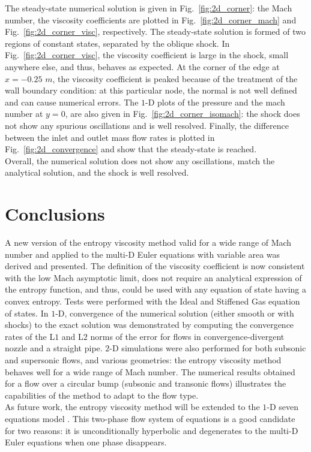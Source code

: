 \documentclass[preprint,10pt]{elsarticle}
\newcommand{\fig}[1]{Fig.~\ref{#1}}                      %
\begin{document}
The steady-state numerical solution is given in \fig{fig:2d_corner}: the Mach number, the viscosity coefficients are plotted in \fig{fig:2d_corner_mach} and \fig{fig:2d_corner_visc}, respectively. The steady-state solution is formed of two regions of constant states, separated by the oblique shock. In \fig{fig:2d_corner_visc}, the viscosity coefficient is large in the shock, small anywhere else, and thus, behaves as expected. At the corner of the edge at $x=-0.25$ $m$, the viscosity coefficient is peaked because of the treatment of the wall boundary condition: at this particular node, the normal is not well defined and can cause numerical errors. The $1$-D plots of the pressure and the mach number at $y=0$, are also given in \fig{fig:2d_corner_isomach}: the shock does not show any spurious oscillations and is well resolved. Finally, the difference between the inlet and outlet mass flow rates is plotted in \fig{fig:2d_convergence} and show that the steady-state is reached. \\
Overall, the numerical solution does not show any oscillations, match the analytical solution, and the shock is well resolved.
\section{Conclusions} \label{sec:ccl}
A new version of the entropy viscosity method valid for a wide range of Mach number and applied to the multi-D Euler equations with variable area was derived and presented. The definition of the viscosity coefficient is now consistent with the low Mach asymptotic limit, does not require an analytical expression of the entropy function, and thus, could be used with any equation of state having a convex entropy. Tests were performed with the Ideal and Stiffened Gas equation of states. In $1$-D, convergence of the numerical solution (either smooth or with shocks) to the exact solution was demonstrated by computing the convergence rates of the L$1$ and L$2$ norms of the error for flows in convergence-divergent nozzle and a straight pipe. $2$-D simulations were also performed for both subsonic and supersonic flows, and various geometries: the entropy viscosity method behaves well for a wide range of Mach number. The numerical results obtained for a flow over a circular bump (subsonic and transonic flows) illustrates the capabilities of the method to adapt to the flow type. \\
As future work, the entropy viscosity method will be extended to the $1$-D seven equations model \cite{SEM}. This two-phase flow system of equations is a good candidate for two reasons: it is unconditionally hyperbolic and degenerates to the multi-D Euler equations when one phase disappears.
\end{document}
